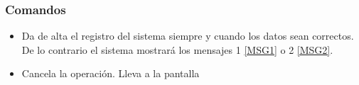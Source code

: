 \subsubsection{Comandos}
\begin{itemize}
 \item {} Da de alta el registro del sistema siempre y cuando los datos sean correctos. De lo contrario el sistema mostrará los mensajes 1 \ref{MSG1} o 2 \ref{MSG2}.
 \item {} Cancela la operación. Lleva a la pantalla 
\end{itemize}

